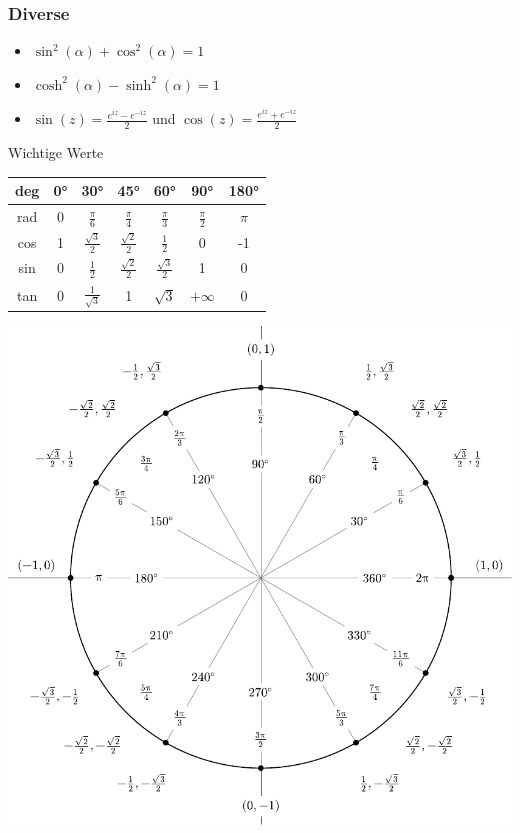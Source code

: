 \documentclass[a4paper,10pt]{article}
\begin{document}
\subsubsection{Diverse}

\begin{itemize}
 \item $\sin^2(\alpha) + \cos^2(\alpha) = 1$
 \item $\cosh^2(\alpha) - \sinh^2(\alpha) = 1$
 \item $\sin(z) = \frac{e^{iz} - e^{-iz}}{2}$ und $\cos(z) = \frac{e^{iz} + e^{-iz}}{2}$
\end{itemize}


\begin{mainbox}{Wichtige Werte}
\begin{center} 
 \begin{tabular}{c|cccccc}
  deg & 0° & 30° & 45° & 60° & 90° & 180° \\
  \midrule
  rad & 0 & $\frac{\pi}{6}$ & $\frac{\pi}{4}$ & $\frac{\pi}{3}$ & $\frac{\pi}{2}$ & $\pi$ \\
  cos & 1 & $\frac{\sqrt{3}}{2}$ & $\frac{\sqrt{2}}{2}$ & $\frac{1}{2}$ & 0 & -1 \\
  sin & 0 & $\frac{1}{2}$ & $\frac{\sqrt{2}}{2}$ & $\frac{\sqrt{3}}{2}$ & 1 & 0 \\
  tan & 0 & $\frac{1}{\sqrt{3}}$ & 1 & $\sqrt{3}$ & $+\infty$ & 0 \\
 \end{tabular}
\end{center}
\end{mainbox}

\begin{center}
\includegraphics[width=\linewidth]{degrees_circle.pdf}
  
\end{center}
\end{document}
